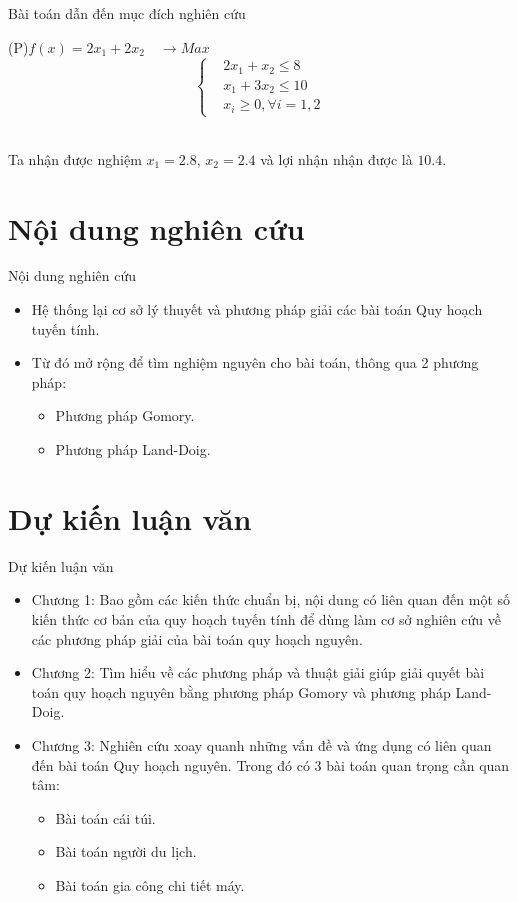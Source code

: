 \documentclass{beamer}
\begin{document}
\begin{frame}{Bài toán dẫn đến mục đích nghiên cứu}
    \begin{center}                    
        \big(P\big)\quad $f(x)=2x_1+2x_2\quad \longrightarrow Max$\\
        \[\left\{\begin{aligned}
            &2x_1+x_2 \leq  8 \\
            &x_1+3x_2 \leq 10 \\
            &x_i\geq 0,\forall i=1,2
        \end{aligned}\right.\]\\
        \end{center}  
        Ta nhận được nghiệm $x_1=2.8$, $x_2=2.4$ và lợi nhận nhận được là $10.4$.    
  
\end{frame}
\section{Nội dung nghiên cứu}
\begin{frame}{Nội dung nghiên cứu}
    \begin{itemize}
    \item Hệ thống lại cơ sở lý thuyết và phương pháp giải các bài toán Quy hoạch tuyến tính.
    \item Từ đó mở rộng để tìm nghiệm nguyên cho bài toán, thông qua 2 phương pháp:
    \begin{itemize}
    \item Phương pháp Gomory.
    \item Phương pháp Land-Doig.
    \end{itemize}
    \end{itemize}
\end{frame}
\section{Dự kiến luận văn}
\begin{frame}{Dự kiến luận văn}
    \begin{itemize}
    \item Chương 1:  Bao gồm các kiến thức chuẩn bị, nội dung có liên quan đến
    một số kiến thức cơ bản của quy hoạch tuyến tính để dùng
    làm cơ sở nghiên cứu về các phương pháp giải của bài toán quy hoạch nguyên.
    \item Chương 2: Tìm hiểu về các phương pháp và thuật giải giúp giải quyết bài toán quy hoạch nguyên bằng phương pháp Gomory và phương pháp Land-Doig.
    \item Chương 3: Nghiên cứu xoay quanh những vấn đề và ứng dụng có liên quan đến bài toán Quy hoạch nguyên. Trong đó có 3 bài toán quan trọng cần quan tâm:
    \begin{itemize}
        \item Bài toán cái túi.
        \item Bài toán người du lịch.
        \item Bài toán gia công chi tiết máy. 
    \end{itemize}
    \end{itemize}   
\end{frame}
\end{document}
